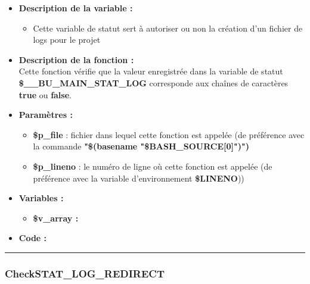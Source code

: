 \documentclass[a4paper,10pt]{article}
\begin{document}
\begin{itemize}
    \item \textbf{Description de la variable :}
    \begin{itemize}
        \item Cette variable de statut sert à autoriser ou non la création d'un fichier de logs pour le projet\\[1\baselineskip]
    \end{itemize}


    \item \textbf{Description de la fonction :}\\
        Cette fonction vérifie que la valeur enregistrée dans la variable de statut \textbf{\color{orange}\$\_\_BU\_MAIN\_STAT\_LOG} corresponde aux chaînes de caractères \textbf{true} ou \textbf{false}.\\[1\baselineskip]

    \item \textbf{Paramètres :}
    \begin{itemize}
        \item \color{orange}\textbf{\$p\_file}\color{white} : fichier dans lequel cette fonction est appelée (de préférence avec la commande \textbf{"\$(\color{gray}basename \color{white}"\color{orange}\$BASH\_SOURCE[0]\color{white}")")}\\[1\baselineskip]

        \item \color{orange}\textbf{\$p\_lineno}\color{white} : le numéro de ligne où cette fonction est appelée (de préférence avec la variable d'environnement \textbf{\color{orange}\$LINENO}))\\[1\baselineskip]
    \end{itemize}

    \item \textbf{Variables :}
    \begin{itemize}
        \item \textbf{\color{orange}\$v\_array\color{white} :}\\[1\baselineskip]
    \end{itemize}


    \item \textbf{Code :}
\end{itemize}



\color{blue}\par\noindent\rule{\textwidth}{0.4pt}\color{white}

\color{blue}
\subsubsection{CheckSTAT\_LOG\_REDIRECT}\color{white}
\end{document}
